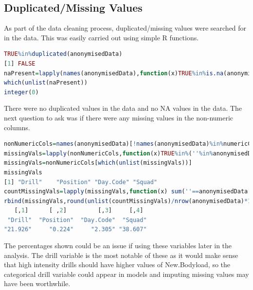 \subsection{Duplicated/Missing Values}
As part of the data cleaning process, duplicated/missing values were searched for in the data. This was easily carried out using simple R functions.
\begin{lstlisting}[language=R,basicstyle=\tiny]
TRUE%in%duplicated(anonymisedData)
[1] FALSE
naPresent=lapply(names(anonymisedData),function(x)TRUE%in%is.na(anonymisedData[,x]))
which(unlist(naPresent))
integer(0)
\end{lstlisting}
There were no duplicated values in the data and no NA values in the data. The next question to ask was if there were any missing values in the non-numeric columns. 
\begin{lstlisting}[language=R,basicstyle=\tiny]
nonNumericCols=names(anonymisedData)[!names(anonymisedData)%in%numericCols]
missingVals=lapply(nonNumericCols,function(x)TRUE%in%(''%in%anonymisedData[,x]))
missingVals=nonNumericCols[which(unlist(missingVals))]
missingVals
[1] "Drill"    "Position" "Day.Code" "Squad"  
countMissingVals=lapply(missingVals,function(x) sum(''==anonymisedData[,x]))
rbind(missingVals,round(unlist(countMissingVals)/nrow(anonymisedData)*100,3))
   [,1]      [ ,2]         [,3]     [,4]    
 "Drill"  "Position"  "Day.Code"  "Squad" 
"21.926"     "0.224"     "2.305" "38.607"
\end{lstlisting}
The percentages shown could be an issue if using these variables later in the analysis. The drill variable is the most notable of these as it would make sense that high intensity drills should have higher values of New.Bodyload, so the categorical drill variable could appear in models and imputing missing values may have been worthwhile.

